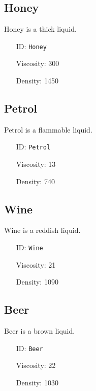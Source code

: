 \subsection{Honey}\label{subsec:liquids_honey}
Honey is a thick liquid.
\newline
\begin{itemize}[nosep]
    \item[ID:] \texttt{Honey}
    \item[Viscosity:] 300
    \item[Density:] 1450
\end{itemize}

\subsection{Petrol}\label{subsec:liquids_petrol}
Petrol is a flammable liquid.
\newline
\begin{itemize}[nosep]
    \item[ID:] \texttt{Petrol}
    \item[Viscosity:] 13
    \item[Density:] 740
\end{itemize}

\subsection{Wine}\label{subsec:liquids_wine}
Wine is a reddish liquid.
\newline
\begin{itemize}[nosep]
    \item[ID:] \texttt{Wine}
    \item[Viscosity:] 21
    \item[Density:] 1090
\end{itemize}

\subsection{Beer}\label{subsec:liquids_beer}
Beer is a brown liquid.
\newline
\begin{itemize}[nosep]
    \item[ID:] \texttt{Beer}
    \item[Viscosity:] 22
    \item[Density:] 1030
\end{itemize}
